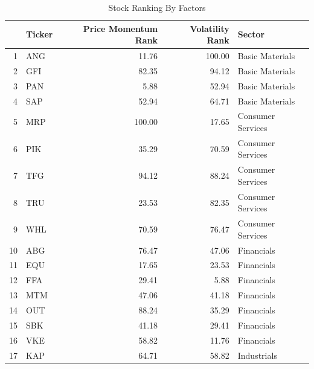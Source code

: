 \documentclass[11pt,preprint, authoryear]{elsarticle}
\numberwithin{equation}{section}
\numberwithin{figure}{section}
\numberwithin{table}{section}
\begin{document}
\begin{longtable}{rlrrl}
\caption{Stock Ranking By Factors \label{tab1}} \\ 
  \hline
 & Ticker & Price Momentum Rank & Volatility  Rank & Sector \\ 
  \hline
1 & ANG & 11.76 & 100.00 & Basic Materials \\ 
  2 & GFI & 82.35 & 94.12 & Basic Materials \\ 
  3 & PAN & 5.88 & 52.94 & Basic Materials \\ 
  4 & SAP & 52.94 & 64.71 & Basic Materials \\ 
  5 & MRP & 100.00 & 17.65 & Consumer Services \\ 
  6 & PIK & 35.29 & 70.59 & Consumer Services \\ 
  7 & TFG & 94.12 & 88.24 & Consumer Services \\ 
  8 & TRU & 23.53 & 82.35 & Consumer Services \\ 
  9 & WHL & 70.59 & 76.47 & Consumer Services \\ 
  10 & ABG & 76.47 & 47.06 & Financials \\ 
  11 & EQU & 17.65 & 23.53 & Financials \\ 
  12 & FFA & 29.41 & 5.88 & Financials \\ 
  13 & MTM & 47.06 & 41.18 & Financials \\ 
  14 & OUT & 88.24 & 35.29 & Financials \\ 
  15 & SBK & 41.18 & 29.41 & Financials \\ 
  16 & VKE & 58.82 & 11.76 & Financials \\ 
  17 & KAP & 64.71 & 58.82 & Industrials \\ 
   \hline
\hline
\end{longtable}
\end{document}
